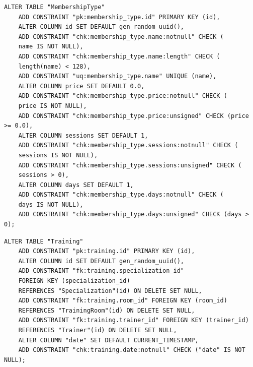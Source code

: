 \begin{lstlisting}[label=alg:19, caption=Реализация  ограничений целостности данных отношения MembershipType, captionpos=t]
	ALTER TABLE "MembershipType"
	ADD CONSTRAINT "pk:membership_type.id" PRIMARY KEY (id),
	ALTER COLUMN id SET DEFAULT gen_random_uuid(),
	ADD CONSTRAINT "chk:membership_type.name:notnull" CHECK (
	name IS NOT NULL),
	ADD CONSTRAINT "chk:membership_type.name:length" CHECK (
	length(name) < 128),
	ADD CONSTRAINT "uq:membership_type.name" UNIQUE (name),
	ALTER COLUMN price SET DEFAULT 0.0,
	ADD CONSTRAINT "chk:membership_type.price:notnull" CHECK (
	price IS NOT NULL),
	ADD CONSTRAINT "chk:membership_type.price:unsigned" CHECK (price >= 0.0),
	ALTER COLUMN sessions SET DEFAULT 1,
	ADD CONSTRAINT "chk:membership_type.sessions:notnull" CHECK (
	sessions IS NOT NULL),
	ADD CONSTRAINT "chk:membership_type.sessions:unsigned" CHECK (
	sessions > 0),
	ALTER COLUMN days SET DEFAULT 1,
	ADD CONSTRAINT "chk:membership_type.days:notnull" CHECK (
	days IS NOT NULL),
	ADD CONSTRAINT "chk:membership_type.days:unsigned" CHECK (days > 0);
\end{lstlisting}

\begin{lstlisting}[label=alg:25, caption=Реализация  ограничений целостности данных отношения Training, captionpos=t]
	ALTER TABLE "Training"
	ADD CONSTRAINT "pk:training.id" PRIMARY KEY (id),
	ALTER COLUMN id SET DEFAULT gen_random_uuid(),
	ADD CONSTRAINT "fk:training.specialization_id" 
	FOREIGN KEY (specialization_id) 
	REFERENCES "Specialization"(id) ON DELETE SET NULL,
	ADD CONSTRAINT "fk:training.room_id" FOREIGN KEY (room_id) 
	REFERENCES "TrainingRoom"(id) ON DELETE SET NULL,
	ADD CONSTRAINT "fk:training.trainer_id" FOREIGN KEY (trainer_id) 
	REFERENCES "Trainer"(id) ON DELETE SET NULL,
	ALTER COLUMN "date" SET DEFAULT CURRENT_TIMESTAMP,
	ADD CONSTRAINT "chk:training.date:notnull" CHECK ("date" IS NOT NULL);
\end{lstlisting}

